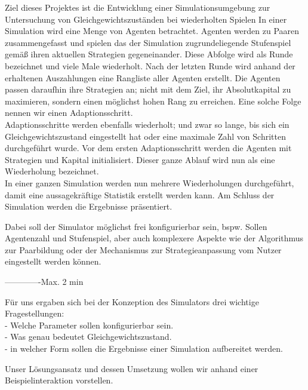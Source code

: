 \documentclass[parskip=full,11pt]{scrartcl}
\begin{document}
Ziel dieses Projektes ist die Entwicklung einer Simulationsumgebung zur Untersuchung von Gleichgewichtszuständen bei wiederholten Spielen
In einer Simulation wird eine Menge von Agenten betrachtet.
Agenten werden zu Paaren zusammengefasst und spielen das der Simulation zugrundeliegende Stufenspiel gemäß ihren aktuellen Strategien gegeneinander. Diese Abfolge wird als Runde bezeichnet und viele Male wiederholt. Nach der letzten Runde wird anhand der erhaltenen Auszahlungen eine Rangliste aller Agenten erstellt. Die Agenten passen daraufhin ihre Strategien an; nicht mit dem Ziel, ihr Absolutkapital zu maximieren, sondern einen möglichst hohen Rang zu erreichen. Eine solche Folge nennen wir einen Adaptionsschritt.\\
Adaptionsschritte werden ebenfalls wiederholt; und zwar so lange, bis sich ein Gleichgewichtszustand eingestellt hat oder eine maximale Zahl von Schritten durchgeführt wurde. Vor dem ersten Adaptionsschritt werden die Agenten mit Strategien und Kapital initialisiert. Dieser ganze Ablauf wird nun als eine Wiederholung bezeichnet.\\
In einer ganzen Simulation werden nun mehrere Wiederholungen durchgeführt, damit eine aussagekräftige Statistik erstellt werden kann. Am Schluss der Simulation werden die Ergebnisse präsentiert.

Dabei soll der Simulator möglichst frei konfigurierbar sein, bspw. Sollen Agentenzahl und Stufenspiel, aber auch komplexere Aspekte wie der Algorithmus zur Paarbildung oder der Mechanismus zur Strategieanpassung vom Nutzer eingestellt werden können.

-------------Max. 2 min

Für uns ergaben sich bei der Konzeption des Simulators drei wichtige Fragestellungen:\\
 - Welche Parameter sollen konfigurierbar sein.\\
 - Was genau bedeutet Gleichgewichtszustand.\\
 - in welcher Form sollen die Ergebnisse einer Simulation aufbereitet werden.

Unser Lösungsansatz und dessen Umsetzung wollen wir anhand einer Beispielinteraktion vorstellen.
\end{document}
